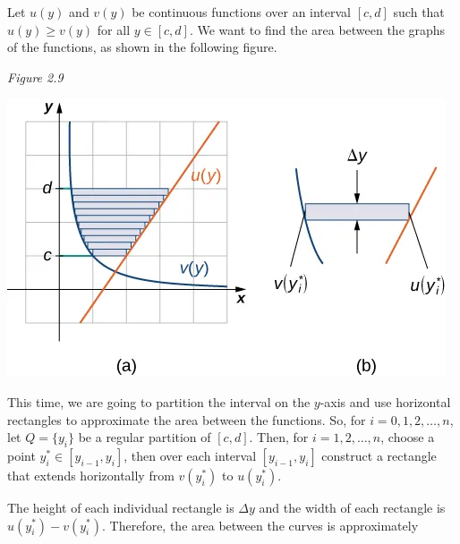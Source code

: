 \documentclass{report}
\begin{document}
    \begin{minipage}{0.47\textwidth}
        Let \( u(y) \) and \( v(y) \) be continuous functions over an interval \([c, d]\) such that \( u(y) \geq v(y) \) for all \( y \in [c, d] \). We want to find the area between the graphs of the functions, as shown in the following figure.
    \end{minipage}
    \bigbreak \noindent 
    \begin{minipage}{0.47\textwidth}
        \bigbreak \noindent 
        \textit{Figure 2.9}
        \begin{center}
            \includegraphics[scale=.45]{./figures/graph6.png }
        \end{center} 
    \end{minipage}
    \begin{minipage}{0.47\textwidth}
        This time, we are going to partition the interval on the \( y \)-axis and use horizontal rectangles to approximate the area between the functions. So, for \( i = 0, 1, 2, \ldots, n \), let \( Q = \{ y_i \} \) be a regular partition of \([c, d]\). Then, for \( i = 1, 2, \ldots, n \), choose a point \( y^*_i \in [y_{i-1}, y_i] \), then over each interval \([y_{i-1}, y_i]\) construct a rectangle that extends horizontally from \( v(y^*_i) \) to \( u(y^*_i) \).
    \end{minipage}
    \bigbreak \noindent 
    \pagebreak \bigbreak \noindent 
    The height of each individual rectangle is \( \Delta y \) and the width of each rectangle is \( u(y^*_i) - v(y^*_i) \). Therefore, the area between the curves is approximately
\end{document}
